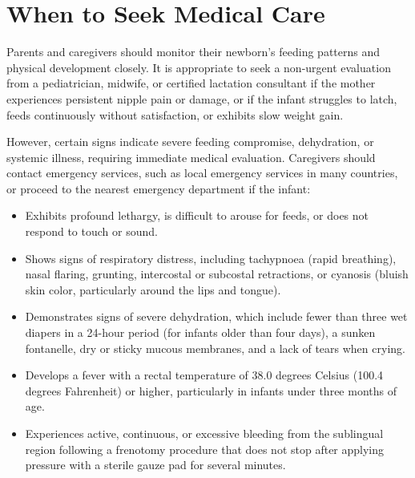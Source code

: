 \section*{When to Seek Medical Care}
Parents and caregivers should monitor their newborn's feeding patterns and physical development closely. It is appropriate to seek a non-urgent evaluation from a pediatrician, midwife, or certified lactation consultant if the mother experiences persistent nipple pain or damage, or if the infant struggles to latch, feeds continuously without satisfaction, or exhibits slow weight gain.

However, certain signs indicate severe feeding compromise, dehydration, or systemic illness, requiring immediate medical evaluation. Caregivers should contact emergency services, such as local emergency services in many countries, or proceed to the nearest emergency department if the infant:
\begin{itemize}
  \item Exhibits profound lethargy, is difficult to arouse for feeds, or does not respond to touch or sound.
  \item Shows signs of respiratory distress, including tachypnoea (rapid breathing), nasal flaring, grunting, intercostal or subcostal retractions, or cyanosis (bluish skin color, particularly around the lips and tongue).
  \item Demonstrates signs of severe dehydration, which include fewer than three wet diapers in a 24-hour period (for infants older than four days), a sunken fontanelle, dry or sticky mucous membranes, and a lack of tears when crying.
  \item Develops a fever with a rectal temperature of 38.0 degrees Celsius (100.4 degrees Fahrenheit) or higher, particularly in infants under three months of age.
  \item Experiences active, continuous, or excessive bleeding from the sublingual region following a frenotomy procedure that does not stop after applying pressure with a sterile gauze pad for several minutes.
\end{itemize}

